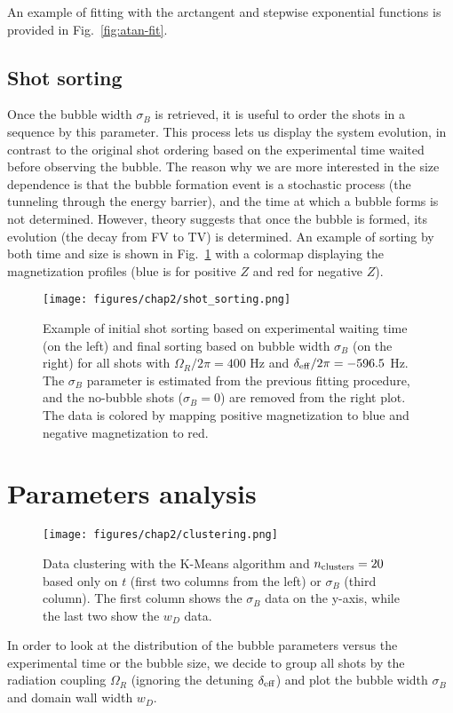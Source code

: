 An example of fitting with the arctangent and stepwise exponential functions is provided in Fig.\ \ref{fig:atan-fit}.

\subsection{Shot sorting}
Once the bubble width $\sigma_B$ is retrieved, it is useful to order the shots in a sequence by this parameter. This process lets us display the system evolution, in contrast to the original shot ordering based on the experimental time waited before observing the bubble. The reason why we are more interested in the size dependence is that the bubble formation event is a stochastic process (the tunneling through the energy barrier), and the time at which a bubble forms is not determined. However, theory suggests that once the bubble is formed, its evolution (the decay from FV to TV) is determined. 
An example of sorting by both time and size is shown in Fig.\ \ref{fig:sorting} with a colormap displaying the magnetization profiles (blue is for positive $Z$ and red for negative $Z$).

\begin{figure}[ht!]
    \centering
    \texttt{[image: figures/chap2/shot\_sorting.png]}
    \caption{Example of initial shot sorting based on experimental waiting time (on the left) and final sorting based on bubble width $\sigma_B$ (on the right) for all shots with $\Omega_R/2\pi = 400$ \unit{\hertz} and $\delta_{\rm eff}/2\pi = -596.5$ \unit{\hertz}. The $\sigma_B$ parameter is estimated from the previous fitting procedure, and the no-bubble shots ($\sigma_B = 0$) are removed from the right plot. The data is colored by mapping positive magnetization to blue and negative magnetization to red.}
    \label{fig:sorting}
\end{figure}

\section{Parameters analysis}
\label{sec:params}
\begin{figure}[ht!]
    \centering
    \texttt{[image: figures/chap2/clustering.png]}
    \caption{Data clustering with the K-Means algorithm and $n_{\rm clusters} = 20$ based only on $t$ (first two columns from the left) or $\sigma_B$ (third column). The first column shows the $\sigma_B$ data on the y-axis, while the last two show the $w_D$ data.}
    \label{fig:clust}
\end{figure} 
In order to look at the distribution of the bubble parameters versus the experimental time or the bubble size, we decide to group all shots by the radiation coupling $\Omega_R$ (ignoring the detuning $\delta_{\rm eff}$) and plot the bubble width $\sigma_B$ and domain wall width $w_D$. 

